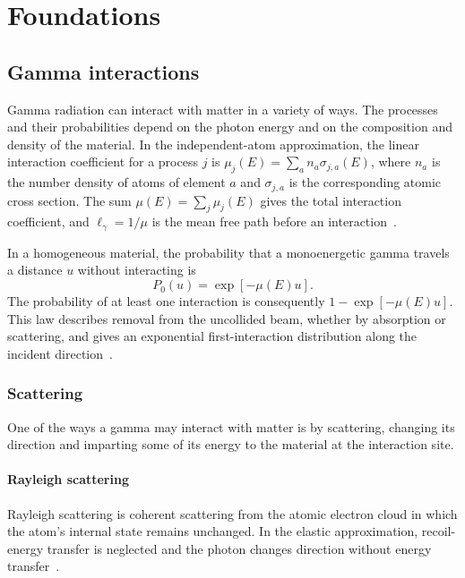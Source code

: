 \chapter{Foundations}
\section{Gamma interactions}

Gamma radiation can interact with matter in a variety of ways. The processes and their probabilities depend on the photon energy and on the composition and density of the material. In the independent-atom approximation, the linear interaction coefficient for a process $j$ is $\mu_j(E)=\sum_a n_a\sigma_{j,a}(E)$, where $n_a$ is the number density of atoms of element $a$ and $\sigma_{j,a}$ is the corresponding atomic cross section. The sum $\mu(E)=\sum_j\mu_j(E)$ gives the total interaction coefficient, and $\ell_\gamma=1/\mu$ is the mean free path before an interaction~\parencite{hubbell1995attenuation}.

In a homogeneous material, the probability that a monoenergetic gamma travels a distance $u$ without interacting is
\begin{equation}
  P_0(u)=\exp[-\mu(E)u].
\end{equation}
The probability of at least one interaction is consequently $1-\exp[-\mu(E)u]$.
This law describes removal from the uncollided beam, whether by absorption or scattering, and gives an exponential first-interaction distribution along the incident direction~\parencite{hubbell1995attenuation}.

\subsection{Scattering}

One of the ways a gamma may interact with matter is by scattering, changing its direction and imparting some of its energy to the material at the interaction site.

\subsubsection{Rayleigh scattering}

Rayleigh scattering is coherent scattering from the atomic electron cloud in which the atom's internal state remains unchanged. In the elastic approximation, recoil-energy transfer is neglected and the photon changes direction without energy transfer~\parencite{hubbell1969photon}.

